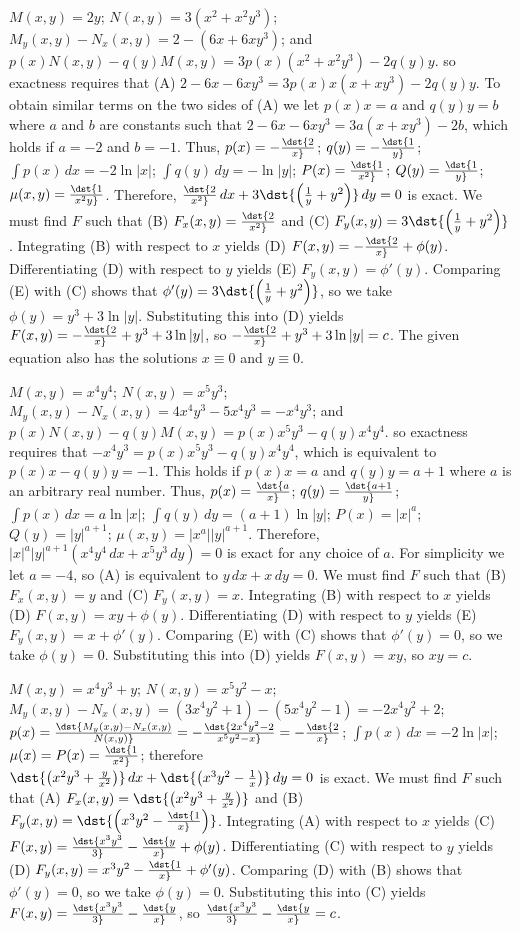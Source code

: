 \documentclass[dvips]{book}
\renewcommand{\exer}[1]{\par\medskip\;\noindent{\color{red}\bf #1.}}
\numberwithin{example}{section}
\numberwithin{equation}{section}
\numberwithin{theorem}{section}
\numberwithin{table}{section}
\numberwithin{figure}{section}
\begin{document}
\exer{2.6.20}
$M(x,y)=2y$;\;
$N(x,y)=3(x^2+x^2y^3)$;\;
 $M_y(x,y)-N_x(x,y)=2-(6x+6xy^3)$;
and  $p(x)N(x,y)-q(y)M(x,y)=3p(x)(x^2+x^2y^3)-2q(y)y$.
so exactness requires that
(A) $2-6x-6xy^3=3p(x)x(x+xy^3)-2q(y)y$.
To obtain  similar terms on the two sides of (A)
we let  $p(x)x=a$ and $q(y)y=b$  where $a$ and $b$ are constants
such that $2-6x-6xy^3=3a(x+xy^3)-2b$, which  holds if
$a=-2$ and $b=-1$. Thus,
 $p(x)=-\dst{2\over x}$;\;
 $q(y)=-\dst{1\over y}$;\;
$\int p(x)\,dx=-2\ln|x|$;\;
$\int q(y)\,dy=-\ln|y|$;\;
$P(x)=\dst{1\over x^2}$;
$Q(y)=\dst{1\over y}$;
$\mu(x,y)=\dst{1\over x^2y}$.
Therefore,
$\dst{2\over x^2}\,dx+3\dst{\left({1\over y}+y^2\right)}\,dy=0$
is exact.
We must find $F$ such that
(B) $F_x(x,y)=\dst{2\over x^2}$ and
(C) $F_y(x,y)=3\dst{\left({1\over y}+y^2\right)}$.
Integrating (B) with respect to $x$ yields
(D) $F(x,y)=-\dst{2\over x}+\phi(y)$.
Differentiating (D) with respect to $y$  yields
(E) $F_y(x,y)=\phi'(y)$.
Comparing (E) with (C)  shows that
$\phi'(y)=3\dst{\left({1\over y}+y^2\right)}$, so we take
$\phi(y)=y^3+3\ln|y|$.
Substituting this into (D) yields
$F(x,y)=-\dst{2\over x}+y^3+3\ln|y|$,
so $-\dst{2\over x}+y^3+3\ln|y|=c$.
The given equation also has the solutions $x\equiv0$
and $y\equiv0$.

\exer{2.6.22}
$M(x,y)=x^4y^4$;\;
$N(x,y)=x^5y^3$;\;
 $M_y(x,y)-N_x(x,y)=4x^4y^3-5x^4y^3=-x^4y^3$;
and  $p(x)N(x,y)-q(y)M(x,y)=p(x)x^5y^3-q(y)x^4y^4$.
so exactness requires that
 $-x^4y^3=p(x)x^5y^3-q(y)x^4y^4$, which is equivalent to
 $p(x)x-q(y)y=-1$. This holds if
 $p(x)x=a$ and $q(y)y=a+1$  where $a$ is an arbitrary real number.
Thus,
 $p(x)=\dst{a\over x}$;\;
 $q(y)=\dst{a+1\over y}$;\;
$\int p(x)\,dx=a\ln|x|$;\;
$\int q(y)\,dy=(a+1)\ln|y|$;\;
$P(x)=|x|^a$;
$Q(y)=|y|^{a+1}$;
$\mu(x,y)=|x^a||y|^{a+1}$.
Therefore,
$|x|^a|y|^{a+1}\left(x^4y^4\,dx+x^5y^3\,dy\right)=0$
is exact for any choice of $a$. For simplicity we let $a=-4$,
so (A)  is equivalent to $y\,dx+x\,dy=0$.
We must find $F$ such that
(B) $F_x(x,y)=y$ and
(C) $F_y(x,y)=x$.
Integrating (B) with respect to $x$ yields
(D) $F(x,y)=xy+\phi(y)$.
Differentiating (D) with respect to $y$  yields
(E) $F_y(x,y)=x+\phi'(y)$.
Comparing (E) with (C)  shows that
$\phi'(y)=0$, so we take
$\phi(y)=0$.
Substituting this into (D) yields
$F(x,y)=xy$,
so $xy=c$.


\exer{2.6.24}
$M(x,y)=x^4y^3+y$;\;
$N(x,y)=x^5y^2-x$;\;
$M_y(x,y)-N_x(x,y)=(3x^4y^2+1)-(5x^4y^2-1)=-2x^4y^2+2$;\;
$p(x)=\dst{M_y(x,y)-N_x(x,y)\over N(x,y)}=-\dst{2x^4y^2-2
\over x^5y^2-x}=-\dst{2\over x}$;\;
$\int p(x)\,dx=-2\ln|x|$;\;
$\mu(x)=P(x)=\dst{1\over x^2}$;
therefore
$\dst{\left(x^2y^3+{y\over x^2}\right)}\,dx+
\dst{\left(x^3y^2-{1\over x}\right)}\,dy=0$
is exact.
We must find $F$ such that
(A) $F_x(x,y)=\dst{\left(x^2y^3+{y\over x^2}\right)}$ and
(B) $F_y(x,y)=\dst{\left(x^3y^2-\dst{1\over x}\right)}$.
Integrating (A) with respect to $x$ yields
(C) $F(x,y)=\dst{x^3y^3\over3}-\dst{y\over x}+\phi(y)$.
Differentiating (C) with respect to $y$  yields
(D) $F_y(x,y)=x^3y^2-\dst{1\over x}+\phi'(y)$.
Comparing (D) with (B)  shows that
$\phi'(y)=0$, so we take
$\phi(y)=0$.
Substituting this into (C) yields
$F(x,y)=\dst{x^3y^3\over3}-\dst{y\over x}$,
so $\dst{x^3y^3\over3}-\dst{y\over x}=c$.
\end{document}
